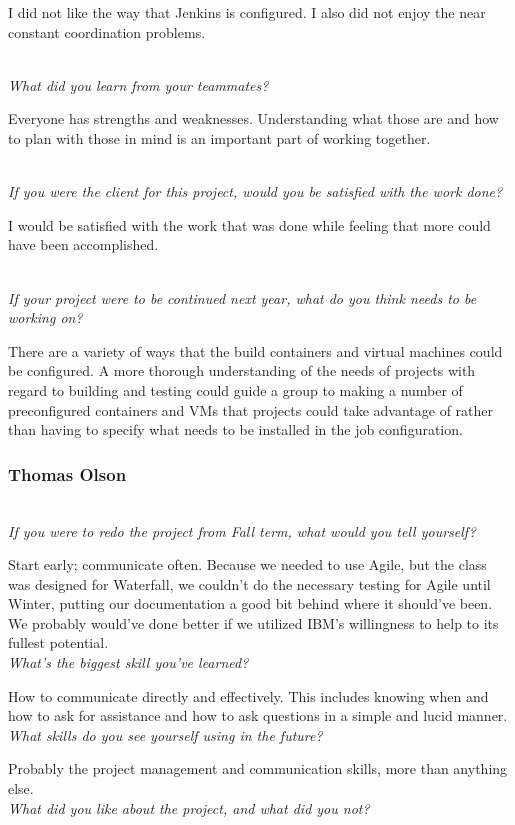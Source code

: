 \documentclass[10pt,letterpaper,onecolumn,draftclsnofoot]{IEEEtran}
\begin{document}
I did not like the way that Jenkins is configured. I also did not enjoy the near constant coordination problems.

\textit{\\What did you learn from your teammates?}

Everyone has strengths and weaknesses. Understanding what those are and how to plan with those in mind is an important part of working together.

\textit{\\If you were the client for this project, would you be satisfied with the work done?}

I would be satisfied with the work that was done while feeling that more could have been accomplished.

\textit{\\If your project were to be continued next year, what do you think needs to be working on?}

There are a variety of ways that the build containers and virtual machines could be configured. A more thorough understanding of the needs of projects with regard to building and testing could guide a group to making a number of preconfigured containers and VMs that projects could take advantage of rather than having to specify what needs to be installed in the job configuration.\\

\subsubsection{Thomas Olson}
\textit{\\If you were to redo the project from Fall term, what would you tell yourself?}

Start early; communicate often. Because we needed to use Agile, but the class was designed for Waterfall, we couldn't do the necessary testing for Agile until Winter, putting our documentation a good bit behind where it should've been. We probably would've done better if we utilized IBM's willingness to help to its fullest potential.
\textit{\\What's the biggest skill you've learned?}

How to communicate directly and effectively. This includes knowing when and how to ask for assistance and how to ask questions in a simple and lucid manner.
\textit{\\What skills do you see yourself using in the future?}

Probably the project management and communication skills, more than anything else.
\textit{\\What did you like about the project, and what did you not?}
\end{document}
